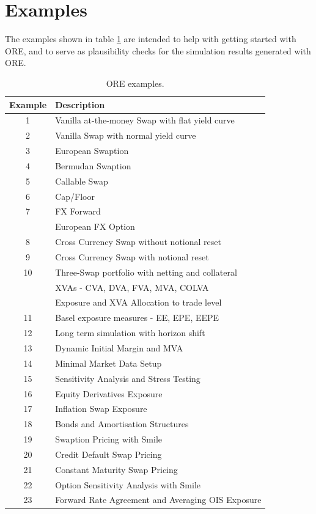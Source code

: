 \documentclass[12pt, a4paper]{article}
\begin{document}
\section{Examples}\label{sec:examples}

The examples shown in table \ref{tab_0} are intended to help with getting started with ORE, and to serve as plausibility
checks for the simulation results generated with ORE.

\begin{table}[hbt]
\scriptsize
\begin{center}
\begin{tabular}{|c|l|}
\hline
Example & Description \\
\hline
\hline
1 & Vanilla at-the-money Swap with flat yield curve \\
\hline
2 & Vanilla Swap with normal yield curve \\
\hline
3 & European Swaption \\
\hline
4 & Bermudan Swaption \\
\hline
5 & Callable Swap \\
\hline
6 & Cap/Floor \\
\hline
7 & FX Forward \\
  & European FX Option \\ 
\hline
8 & Cross Currency Swap without notional reset \\
\hline
9 & Cross Currency Swap with notional reset \\
\hline
10 & Three-Swap portfolio with netting and collateral \\
   & XVAs - CVA, DVA, FVA, MVA, COLVA \\
   & Exposure and XVA Allocation to trade level \\
\hline
11 & Basel exposure measures - EE, EPE, EEPE \\
\hline
12 & Long term simulation with horizon shift \\
\hline
13 & Dynamic Initial Margin and MVA \\
\hline
14 & Minimal Market Data Setup \\
\hline
15 & Sensitivity Analysis and Stress Testing \\
\hline
16 & Equity Derivatives Exposure \\
\hline
17 & Inflation Swap Exposure \\
\hline
18 & Bonds and Amortisation Structures\\
\hline
19 & Swaption Pricing with Smile\\
\hline
20 & Credit Default Swap Pricing\\
\hline
21 & Constant Maturity Swap Pricing\\
\hline
22 & Option Sensitivity Analysis with Smile\\
\hline
23 & Forward Rate Agreement and Averaging OIS Exposure\\
\hline
\end{tabular}
\caption{ORE examples.}
\label{tab_0}
\end{center}
\end{table}
\end{document}
